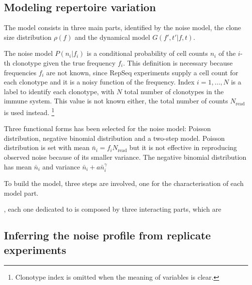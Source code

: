 \documentclass[a4paper,twocolumn]{article}
\begin{document}



\subsection{Modeling repertoire variation}
The model consists in three main parts, identified by the noise model, the clone size distribution $\rho(f)$ and the dynamical model $G(f', t'|f, t)$.


The noise model $P(n_i|f_i)$ is a conditional probability of cell counts $n_i$ of the $i$-th clonotype given the true frequency $f_i$. This definition is necessary because frequencies $f_i$ are not known, since RepSeq experiments supply a cell count for each clonotype and it is a noisy function of the frequency.
Index $i = 1, \dots, N$ is a label to identify each clonotype, with $N$ total number of clonotypes in the immune system. This value is not known either, the total number of counts $N_\mathrm{read}$ is used instead.%
\footnote{Clonotype index is omitted when the meaning of variables is clear.} %

Three functional forms has been selected for the noise model: Poisson distribution, negative binomial distribution and a two-step model. Poisson distribution is set with mean $\bar{n}_i = f_i N_\mathrm{read}$ but it is not effective in reproducing observed noise because of its smaller variance. The negative binomial distribution has mean $\bar{n}_i$ and variance $\bar{n}_i + a \bar{n}_i^\gamma$ %

To build the model, three steps are involved, one for the characterisation of each model part.





, each one dedicated to is composed by three interacting parts, which are 



\subsection{Inferring the noise profile from replicate experiments}

\end{document}
